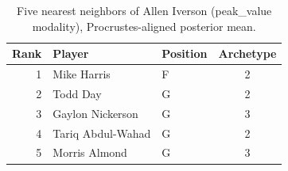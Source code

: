 \begin{table}[htbp]
  \centering\small
  \begin{tabular}{rllc}
    \toprule
    Rank & Player & Position & Archetype \\
    \midrule
    1 & Mike Harris & F & 2 \\
    2 & Todd Day & G & 2 \\
    3 & Gaylon Nickerson & G & 3 \\
    4 & Tariq Abdul-Wahad & G & 2 \\
    5 & Morris Almond & G & 3 \\
    \bottomrule
  \end{tabular}
  \caption{Five nearest neighbors of Allen Iverson (peak_value modality), Procrustes-aligned posterior mean.}
  \label{tab:Allen_Iverson_neighbors_peak_value}
\end{table}

